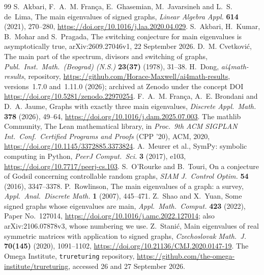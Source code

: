 \documentclass[11pt]{article}
\numberwithin{equation}{section}
\theoremstyle{remark}
\newcommand{\repoversion}{1.11.0}
\begin{document}
{\footnotesize
\begin{thebibliography}{99}\setlength{\itemsep}{0pt}
S.~Akbari, F.~A.~M. Fran\c{c}a, E.~Ghasemian, M.~Javarsineh and L.~S. de~Lima,
The main eigenvalues of signed graphs, \emph{Linear Algebra Appl.}
\textbf{614} (2021), 270--280, \url{https://doi.org/10.1016/j.laa.2020.04.029}.
S.~Akbari, H.~Kumar, B.~Mohar and S.~Pragada, The switching conjecture for
main eigenvalues is asymptotically true, arXiv:2609.27046v1, 22 September
2026.
D.~M. Cvetkovi\'c, The main part of the spectrum, divisors and switching of
graphs, \emph{Publ.\ Inst.\ Math.\ (Beograd) (N.S.)} \textbf{23(37)} (1978),
31--38.
H.~Dong, \emph{ai4math-results}, repository,
\url{https://github.com/Horace-Maxwell/ai4math-results}, versions~1.7.0
and~\repoversion{} (2026); archived at Zenodo under the concept DOI
\url{https://doi.org/10.5281/zenodo.22970254}.
F.~A.~M. Fran\c{c}a, A.~E. Brondani and D.~A. Jaume, Graphs with exactly three
main eigenvalues, \emph{Discrete Appl.\ Math.} \textbf{378} (2026), 49--64,
\url{https://doi.org/10.1016/j.dam.2025.07.003}.
The mathlib Community, The Lean mathematical library, in \emph{Proc.\ 9th ACM
SIGPLAN Int.\ Conf.\ Certified Programs and Proofs} (CPP '20), ACM, 2020,
\url{https://doi.org/10.1145/3372885.3373824}.
A.~Meurer et al., SymPy: symbolic computing in Python, \emph{PeerJ Comput.\
Sci.} \textbf{3} (2017), e103, \url{https://doi.org/10.7717/peerj-cs.103}.
\bibitem{ort}
S.~O'Rourke and B.~Touri, On a conjecture of Godsil concerning controllable
random graphs, \emph{SIAM J.\ Control Optim.} \textbf{54} (2016), 3347--3378.
\bibitem{row07}
P.~Rowlinson, The main eigenvalues of a graph: a survey, \emph{Appl.\ Anal.\
Discrete Math.} \textbf{1} (2007), 445--471.
\bibitem{sy}
Z.~Shao and X.~Yuan, Some signed graphs whose eigenvalues are main, \emph{Appl.\
Math.\ Comput.} \textbf{423} (2022), Paper No.~127014,
\url{https://doi.org/10.1016/j.amc.2022.127014}; also arXiv:2106.07878v3,
whose numbering we use.
\bibitem{sta}
Z.~Stani\'c, Main eigenvalues of real symmetric matrices with application to
signed graphs, \emph{Czechoslovak Math.\ J.} \textbf{70(145)} (2020),
1091--1102, \url{https://doi.org/10.21136/CMJ.2020.0147-19}.
\bibitem{tru}
The Omega Institute, \texttt{trureturing} repository,
\url{https://github.com/the-omega-institute/trureturing}, accessed 26 and 27
September 2026.
\end{thebibliography}}
\end{document}
